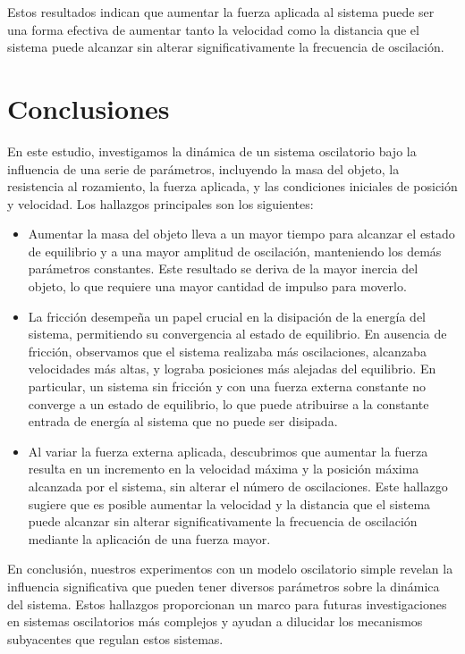 \documentclass[]{article}
\begin{document}
Estos resultados indican que aumentar la fuerza aplicada al sistema puede ser una forma efectiva de aumentar tanto la velocidad como la distancia que el sistema puede alcanzar sin alterar significativamente la frecuencia de oscilación.

\section{Conclusiones}
En este estudio, investigamos la dinámica de un sistema oscilatorio bajo la influencia de una serie de parámetros, incluyendo la masa del objeto, la resistencia al rozamiento, la fuerza aplicada, y las condiciones iniciales de posición y velocidad. Los hallazgos principales son los siguientes:

\begin{itemize}
\item Aumentar la masa del objeto lleva a un mayor tiempo para alcanzar el estado de equilibrio y a una mayor amplitud de oscilación, manteniendo los demás parámetros constantes. Este resultado se deriva de la mayor inercia del objeto, lo que requiere una mayor cantidad de impulso para moverlo.
\item La fricción desempeña un papel crucial en la disipación de la energía del sistema, permitiendo su convergencia al estado de equilibrio. En ausencia de fricción, observamos que el sistema realizaba más oscilaciones, alcanzaba velocidades más altas, y lograba posiciones más alejadas del equilibrio. En particular, un sistema sin fricción y con una fuerza externa constante no converge a un estado de equilibrio, lo que puede atribuirse a la constante entrada de energía al sistema que no puede ser disipada.
\item Al variar la fuerza externa aplicada, descubrimos que aumentar la fuerza resulta en un incremento en la velocidad máxima y la posición máxima alcanzada por el sistema, sin alterar el número de oscilaciones. Este hallazgo sugiere que es posible aumentar la velocidad y la distancia que el sistema puede alcanzar sin alterar significativamente la frecuencia de oscilación mediante la aplicación de una fuerza mayor.
\end{itemize}

En conclusión, nuestros experimentos con un modelo oscilatorio simple revelan la influencia significativa que pueden tener diversos parámetros sobre la dinámica del sistema. Estos hallazgos proporcionan un marco para futuras investigaciones en sistemas oscilatorios más complejos y ayudan a dilucidar los mecanismos subyacentes que regulan estos sistemas.
\end{document}
